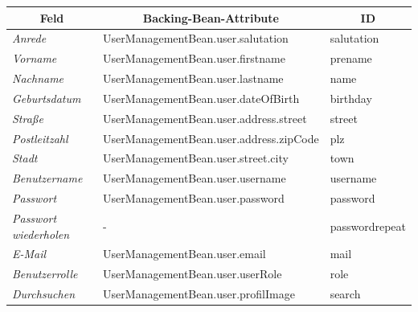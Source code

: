 \begin{itemize}
				\begin{center}
					\begin{longtable}{|p{3cm} |p{8cm}| p{3cm}|}
						
						\hline \multicolumn{1}{|c|}{\textbf{Feld}} & \multicolumn{1}{|c|}{\textbf{Backing-Bean-Attribute}} & \multicolumn{1}{|c|}{\textbf{ID}} \\ \hline
						\endfirsthead
						\hline
						\endlastfoot
						\textit{Anrede} & UserManagementBean.user.salutation & salutation\\ \hline
						\textit{Vorname} & UserManagementBean.user.firstname & prename\\ \hline
						\textit{Nachname} & UserManagementBean.user.lastname & name\\ \hline
						\textit{Geburtsdatum} & UserManagementBean.user.dateOfBirth & birthday\\ \hline
						\textit{Straße} & UserManagementBean.user.address.street & street\\ \hline
						\textit{Postleitzahl} & UserManagementBean.user.address.zipCode & plz\\ \hline	
						\textit{Stadt} & UserManagementBean.user.street.city & town\\ \hline
						\textit{Benutzername} & UserManagementBean.user.username & username\\ \hline	
						\textit{Passwort} & UserManagementBean.user.password & password\\ \hline	
						\textit{Passwort wiederholen} & - & passwordrepeat\\ \hline
						\textit{E-Mail} & UserManagementBean.user.email & mail\\ \hline
						\textit{Benutzerrolle} & UserManagementBean.user.userRole & role\\ \hline
						\textit{Durchsuchen} & UserManagementBean.user.profilImage & search\\ \hline
					\end{longtable}
					\begin{longtable}{|p{3cm} | p{4cm} | p{3cm} |p{3cm}|}
						

\end{longtable}
\end{center}
\end{itemize}
